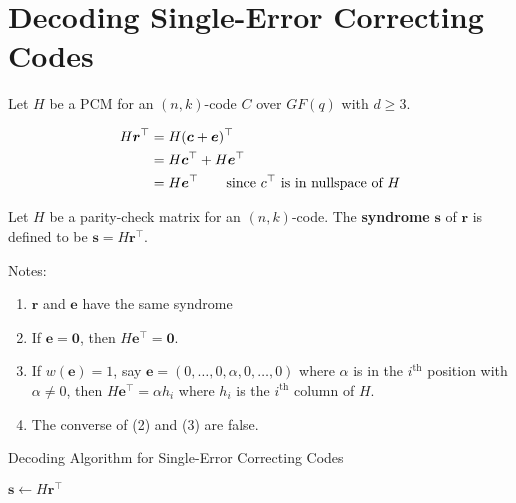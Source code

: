 \section{Decoding Single-Error Correcting Codes}
Let $ H $ be a PCM for an $ (n,k) $-code $ C $ over $ GF(q) $
with $ d\geqslant 3 $.

\begin{align*}
    H\bm{r}^\top
     & =H(\bm{c}+\bm{e})^\top                                           \\
     & =H\bm{c}^\top+H \bm{e}^\top                                      \\
     & =H\bm{e}^\top \qquad\text{since $ c^\top $ is in nullspace of }H
\end{align*}

\begin{defbox}
    \begin{definition}
        Let $ H $ be a parity-check matrix for an $ (n,k) $-code.
        The \textbf{syndrome} $ \bm{s} $ of $ \bm{r} $
        is defined to be $ \bm{s}=H\bm{r}^\top $.
    \end{definition}
\end{defbox}

Notes:
\begin{enumerate}[(1)]
    \item $ \bm{r} $ and $ \bm{e} $ have the same syndrome
    \item If $ \bm{e}=\bm{0} $, then $ H\bm{e}^\top=\bm{0} $.
    \item If $ w(\bm{e})=1 $, say $ \bm{e}=(0,\ldots,0,\alpha,0,\ldots,0) $
          where $ \alpha $ is in the $ i^{\text{th}} $ position with $ \alpha \neq 0 $,
          then $ H\bm{e}^\top=\alpha h_i $ where $ h_i $ is the $ i^{\text{th}} $
          column of $ H $.
    \item The converse of (2) and (3) are false.
\end{enumerate}

\begin{algbox}
    \begin{algorithm}[H]
        \DontPrintSemicolon
        \caption{Decoding Algorithm for Single-Error Correcting Codes}\label{alg:Decoding Algorithm for Single-Error Correcting Codes}

        $ \bm{s}\gets H\bm{r}^\top $\;
         {
        }
         {
             {
            }
        }
        \Return
    \end{algorithm}
\end{algbox}

